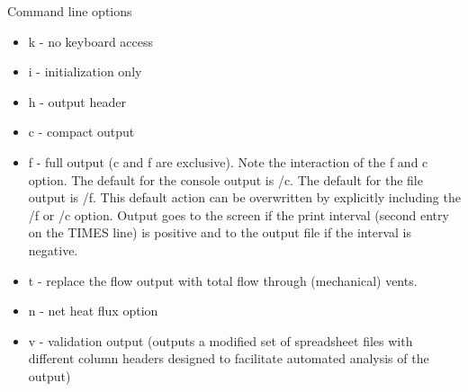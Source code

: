 Command line options

\begin{itemize}
\item k - no keyboard access
\item i - initialization only
\item h - output header
\item c - compact output
\item f - full output (c and f are exclusive). Note the interaction of the f and c option. The default for the console output is /c. The default for the file output is /f. This default action can be overwritten by explicitly including the /f or /c option. Output goes to the screen if the print interval (second entry on the TIMES line) is positive and to the output file if the interval is negative.
\item t - replace the flow output with total flow through (mechanical) vents.
\item n - net heat flux option
\item v - validation output (outputs a modified set of spreadsheet files with different column headers designed to facilitate automated analysis of the output)
\end{itemize}
